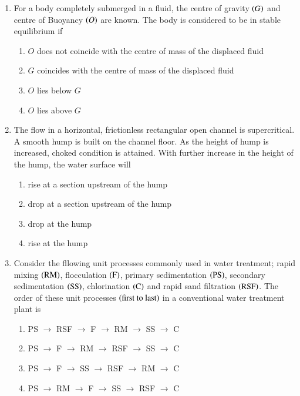 \documentclass[journal,onecolumn]{IEEEtran}
\theoremstyle{remark}
\begin{document}
\begin{enumerate}
    \item For a body completely submerged in a fluid, the centre of gravity $\left(G\right)$ and centre of Buoyancy $\left(O\right)$ are known. The body is considered to be in stable equilibrium if
	\hfill{}

	\begin{enumerate}
		\item $O$ does not coincide with the centre of mass of the displaced fluid
		\item $G$ coincides with the centre of mass of the displaced fluid
		\item $O$ lies below $G$
		\item $O$ lies above $G$
	\end{enumerate}

    \item The flow in a horizontal, frictionless rectangular open channel is supercritical. A smooth hump is built on the channel floor. As the height of hump is increased, choked condition is attained. With further increase in the height of the hump, the water surface will
	\hfill{}

	\begin{enumerate}
		\item rise at a section upstream of the hump
		\item drop at a section upstream of the hump
		\item drop at the hump
		\item rise at the hump
	\end{enumerate}

    \item Consider the fllowing unit processes commonly used in water treatment; rapid mixing $\left(\text{RM}\right)$, flocculation $\left(\text{F}\right)$, primary sedimentation $\left(\text{PS}\right)$, secondary sedimentation $\left(\text{SS}\right)$, chlorination $\left(\text{C}\right)$ and rapid sand filtration $\left(\text{RSF}\right)$. The order of these unit processes $\left(\text{first to last}\right)$ in a conventional water treatment plant is
	\hfill{}
	\begin{enumerate}
		\item PS $\to$ RSF $\to$ F $\to$ RM $\to$ SS $\to$ C
		\item PS $\to$ F $\to$ RM $\to$ RSF $\to$ SS $\to$ C
		\item PS $\to$ F $\to$ SS $\to$ RSF $\to$ RM $\to$ C
		\item PS $\to$ RM $\to$ F $\to$ SS $\to$ RSF $\to$ C
	\end{enumerate}



\end{enumerate}
\end{document}
